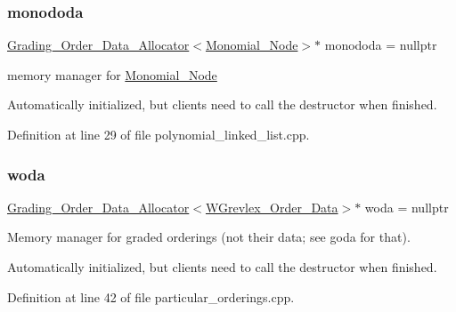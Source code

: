 \subsubsection{\texorpdfstring{monododa}{monododa}}
{\footnotesize\ttfamily \hyperlink{group__memorygroup_class_grading___order___data___allocator}{Grading\+\_\+\+Order\+\_\+\+Data\+\_\+\+Allocator}$<$\hyperlink{group__polygroup_class_monomial___node}{Monomial\+\_\+\+Node}$>$$\ast$ monododa = nullptr}



memory manager for \hyperlink{group__polygroup_class_monomial___node}{Monomial\+\_\+\+Node} 

Automatically initialized, but clients need to call the destructor when finished. 

Definition at line 29 of file polynomial\+\_\+linked\+\_\+list.\+cpp.

\mbox{\label{group__memorygroup_ga929e61b883d430fc6909a80fdb9ebb83}} 
\subsubsection{\texorpdfstring{woda}{woda}}
{\footnotesize\ttfamily \hyperlink{group__memorygroup_class_grading___order___data___allocator}{Grading\+\_\+\+Order\+\_\+\+Data\+\_\+\+Allocator}$<$\hyperlink{group__orderinggroup_class_w_grevlex___order___data}{W\+Grevlex\+\_\+\+Order\+\_\+\+Data}$>$$\ast$ woda = nullptr}



Memory manager for graded orderings (not their data; see goda for that). 

Automatically initialized, but clients need to call the destructor when finished. 

Definition at line 42 of file particular\+\_\+orderings.\+cpp.

